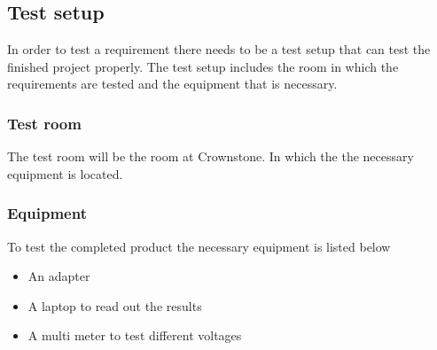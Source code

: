 \subsection{Test setup}
\label{sec:Test_setup}
In order to test a requirement there needs to be a test setup that can test the finished project properly. The test setup includes the room in which the requirements are tested and the equipment that is necessary.

\subsubsection{Test room}
The test room will be the room at Crownstone. In which the the necessary equipment is located.

\subsubsection{Equipment}

To test the completed product the necessary equipment is listed below

\begin{itemize}
    \item An adapter
    \item A laptop to read out the results
    \item A multi meter to test different voltages
\end{itemize}


